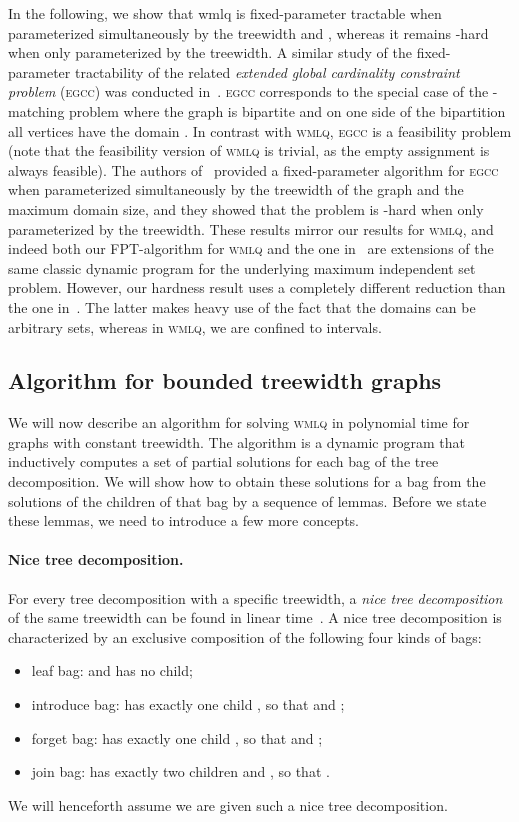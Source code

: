 \documentclass{llncs}
\begin{document}
In the following, we show that {\sc wmlq} is fixed-parameter tractable when parameterized simultaneously by the treewidth and , whereas it remains -hard when only parameterized by the treewidth.
A similar study of the fixed-parameter tractability of the related \emph{extended global cardinality constraint problem} (\textsc{egcc}) was conducted in~\cite{SS11}.
\textsc{egcc} corresponds to the special case of the -matching problem where the graph is bipartite and on one side of the bipartition all vertices have the domain . In contrast with \textsc{wmlq}, \textsc{egcc} is a feasibility problem (note that the feasibility version of \textsc{wmlq} is trivial, as the empty assignment is always feasible).
 The authors of~\cite{SS11} provided a fixed-parameter algorithm for \textsc{egcc} when parameterized simultaneously by the treewidth of the graph and the maximum domain size, and they showed that the problem is -hard when only parameterized by the treewidth. These results mirror our results for \textsc{wmlq}, and indeed both our FPT-algorithm for \textsc{wmlq} and the one in~\cite{SS11} are extensions of the same classic dynamic program for the underlying maximum independent set problem. However, our hardness result uses a completely different reduction than the one in~\cite{SS11}. The latter makes heavy use of the fact that the domains can be arbitrary sets, whereas in \textsc{wmlq}, we are confined to intervals.

\subsection{Algorithm for bounded treewidth graphs}

We will now describe an algorithm for solving \textsc{wmlq} in polynomial time for graphs with constant treewidth. The algorithm is a dynamic program that inductively computes a set of partial solutions for each bag of the tree decomposition. We will show how to obtain these solutions for a bag from the solutions of the children of that bag by a sequence of lemmas. Before we state these lemmas, we need to introduce a few more concepts.

\paragraph{Nice tree decomposition.}
For every tree decomposition with a specific treewidth, a \emph{nice tree decomposition}
of the same treewidth can be found in linear time~\cite{Klo94}. A nice tree decomposition
is characterized by an exclusive composition of the following four kinds of bags:
\begin{itemize}
\item leaf bag:  and  has no child;
\item introduce bag:  has exactly one child , so that  and ;
\item forget bag:  has exactly one child , so that  and ;
\item join bag:  has exactly two children  and , so that .
\end{itemize}
We will henceforth assume we are given such a nice tree decomposition.
\end{document}
